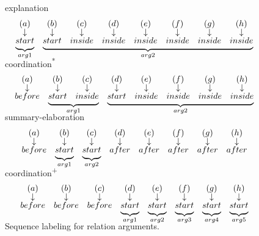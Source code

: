 \begin{figure}[!htbp]
\centering

explanation
\[
\begin{array}{*8{c}}
(a)&(b)&(c)&(d)&(e)&(f)&(g)&(h)\\[-2pt]
\downarrow&\downarrow&\downarrow&\downarrow&\downarrow&\downarrow&\downarrow&\downarrow\\[-2pt]
\undermat{arg1}{start}&\undermat{arg2}{start&inside&inside&inside&inside&inside&inside}
\end{array}
\]
\vspace{1em}

coordination\textsuperscript{*}
\[
\begin{array}{*8{c}}
(a)&(b)&(c)&(d)&(e)&(f)&(g)&(h)\\[-2pt]
\downarrow&\downarrow&\downarrow&\downarrow&\downarrow&\downarrow&\downarrow&\downarrow\\[-2pt]
before&\undermat{arg1}{start&inside}&\undermat{arg2}{start&inside&inside&inside&inside}
\end{array}
\]
\vspace{1em}

summary-elaboration
\[
\begin{array}{*8{c}}
(a)&(b)&(c)&(d)&(e)&(f)&(g)&(h)\\[-2pt]
\downarrow&\downarrow&\downarrow&\downarrow&\downarrow&\downarrow&\downarrow&\downarrow\\[-2pt]
before&\undermat{arg1}{start}&\undermat{arg2}{start}&after&after&after&after&after
\end{array}
\]
\vspace{1em}

coordination\textsuperscript{+}
\[
\begin{array}{*8{c}}
(a)&(b)&(c)&(d)&(e)&(f)&(g)&(h)\\[-2pt]
\downarrow&\downarrow&\downarrow&\downarrow&\downarrow&\downarrow&\downarrow&\downarrow\\[-2pt]
before&before&before&\undermat{arg1}{start}&\undermat{arg2}{start}&\undermat{arg3}{start}&\undermat{arg4}{start}&\undermat{arg5}{start}
\end{array}
\]
\vspace{1em}

\caption{\label{i:rare-args} Sequence labeling for relation arguments. }

\end{figure}
